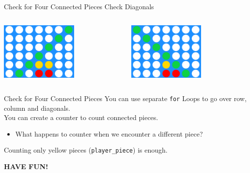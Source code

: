         \begin{frame}{Check for Four Connected Pieces}
            \LARGE
            Check Diagonals\\
            \begin{columns}
                \begin{column}{0.5\textwidth}
                    \centering
                    \includegraphics[width=0.6\textwidth]{images/connect_four_board_4.png}
                \end{column}
                \pause
                \begin{column}{0.5\textwidth}
                    \centering
                    \includegraphics[width=0.6\textwidth]{images/connect_four_board_5.png}\\
                \end{column}
            \end{columns}
        \end{frame}

        \begin{frame}{Check for Four Connected Pieces}
            \LARGE
            You can use separate \texttt{for} Loops to go over row, column and diagonals.\\
            \pause
            You can create a counter to count connected pieces.
            \pause
            \begin{itemize}
                \item What happens to counter when we encounter a different piece?
            \end{itemize}
            \pause
            Counting only yellow pieces (\texttt{player\_piece}) is enough.\\
            \bigskip
            \begin{center}
                \Huge
                \textbf{HAVE FUN!}
            \end{center}
        \end{frame}

